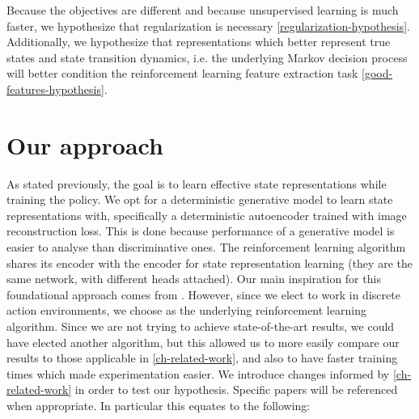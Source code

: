 Because the objectives are different and because unsupervised learning is much faster,
we hypothesize that regularization is necessary \ref{regularization-hypothesis}.
Additionally, we hypothesize that representations which better represent true states
and state transition dynamics, i.e. the underlying Markov decision process
will better condition the reinforcement learning feature extraction task \ref{good-features-hypothesis}.

\section{Our approach}
As stated previously, the goal is to learn effective state representations
while training the policy.
We opt for a deterministic generative model to learn state representations with,
specifically a deterministic autoencoder trained with image reconstruction loss.
This is done because performance of a generative model is easier to analyse than discriminative ones.
The reinforcement learning algorithm shares its encoder with the encoder 
for state representation learning (they are the same network, with different heads attached).
Our main inspiration for this foundational approach comes from \cite{sac+ae}.
However, since we elect to work in discrete action environments, we choose \cite{rainbow}
as the underlying reinforcement learning algorithm.
Since we are not trying to achieve state-of-the-art results, we could have elected
another algorithm, but this allowed us to more easily compare our results
to those applicable in \ref{ch-related-work}, and also to have faster training times
which made experimentation easier.
We introduce changes informed by \ref{ch-related-work} in order to test our hypothesis.
Specific papers will be referenced when appropriate.
In particular this equates to the following:

